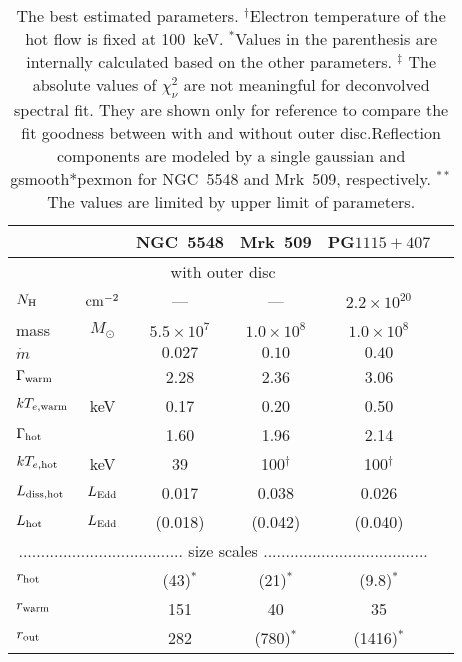 \documentclass[a4paper,fleqn,usenatbib]{mnras}
\begin{document}
\begin{table}
	\centering
	\caption{The best estimated parameters. $^\dagger$Electron temperature of the hot flow is fixed at 100~keV. $^\ast$Values in the parenthesis
	are internally calculated based on the other parameters.
	$^\ddagger$ The absolute values of $\chi^2 _\nu$ are not meaningful for deconvolved spectral fit. They are shown only for reference to compare the fit goodness  between with and without outer disc.Reflection components are modeled by a single gaussian and {\sc gsmooth*pexmon}   for  NGC~5548 and Mrk~509, respectively.
	$^{**}$ The values are limited by upper limit of parameters.}
	\label{tab:fit}
	\begin{tabular}{lccccc} 
		\hline
	&&
	NGC~5548&Mrk~509&PG$1115+407$\\ \hline\hline
\multicolumn{5}{c}{with outer disc}\\ \hline
$N_{\rm H}$ & ${\rm cm^{-2}}$ & --- & --- & $2.2\times 10^{20}$ \\
mass		&$M_\odot$&$5.5\times 10^7$&$1.0\times10^8$&$1.0\times10^8$\\
$\dot{m}$ &&$0.027$&$0.10$&$0.40$\\
$\Gamma_{\rm warm}$ &&2.28&2.36&3.06\\
$kT_{e,\rm warm}$ &keV&0.17&0.20&0.50\\
$\Gamma_{\rm hot}$& &1.60&1.96&2.14\\
$kT_{e,\rm hot}$ &keV&39&100$^\dagger$&100$^\dagger$\\
$L_{\rm diss,hot}$&$L_{\rm Edd}$&0.017&0.038&0.026\\
$L_{\rm hot}$&$L_{\rm Edd}$ &(0.018)&(0.042)&(0.040)\\
\multicolumn{5}{c}{..................................... size scales .....................................}\\
\multicolumn{2}{l}{$r_{\rm hot}$} &(43)$^\ast$&(21)$^\ast$&(9.8)$^\ast$\\
\multicolumn{2}{l}{$r_{\rm warm}$} &151&40&35\\
\multicolumn{2}{l}{$r_{\rm out}$} &282&(780)$^\ast$&(1416)$^\ast$\\

\end{tabular}
\end{table}
\end{document}
